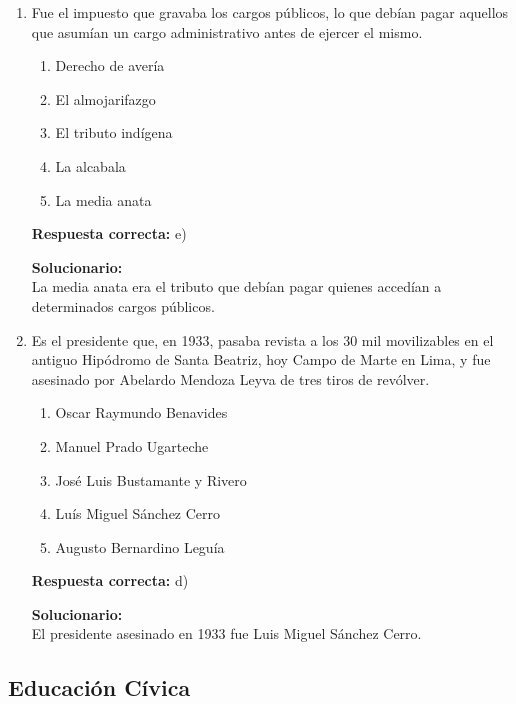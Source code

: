 \begin{enumerate}
	
	\item Fue el impuesto que gravaba los cargos públicos, lo que debían pagar aquellos que asumían un cargo administrativo antes de ejercer el mismo.
	\begin{enumerate}[label=\alph*)]
		\item Derecho de avería
		\item El almojarifazgo
		\item El tributo indígena
		\item La alcabala
		\item La media anata
	\end{enumerate}
	\textbf{Respuesta correcta:} e)
	
	\vspace{2mm}
	\textbf{Solucionario:}\\
	La media anata era el tributo que debían pagar quienes accedían a determinados cargos públicos.
	
	\vspace{6mm}
	
	\item Es el presidente que, en 1933, pasaba revista a los 30 mil movilizables en el antiguo Hipódromo de Santa Beatriz, hoy Campo de Marte en Lima, y fue asesinado por Abelardo Mendoza Leyva de tres tiros de revólver.
	\begin{enumerate}[label=\alph*)]
		\item Oscar Raymundo Benavides
		\item Manuel Prado Ugarteche
		\item José Luis Bustamante y Rivero
		\item Luís Miguel Sánchez Cerro
		\item Augusto Bernardino Leguía
	\end{enumerate}
	\textbf{Respuesta correcta:} d)
	
	\vspace{2mm}
	\textbf{Solucionario:}\\
	El presidente asesinado en 1933 fue Luis Miguel Sánchez Cerro.
	
	\vspace{6mm}
	
\end{enumerate}

\subsection*{Educación Cívica}

